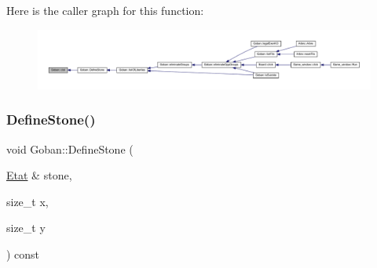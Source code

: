 Here is the caller graph for this function\+:
\nopagebreak
\begin{figure}[H]
\begin{center}
\leavevmode
\includegraphics[width=350pt]{class_goban_a579840586df08a58983f6b497979344b_icgraph}
\end{center}
\end{figure}
\mbox{\label{class_goban_a0e2596110cdbb9b007b2b2fd8d5a9973}} 
\subsubsection{\texorpdfstring{Define\+Stone()}{DefineStone()}}
{\footnotesize\ttfamily void Goban\+::\+Define\+Stone (\begin{DoxyParamCaption}\item[{\hyperlink{class_etat}{Etat} \&}]{stone,  }\item[{size\+\_\+t}]{x,  }\item[{size\+\_\+t}]{y }\end{DoxyParamCaption}) const}

